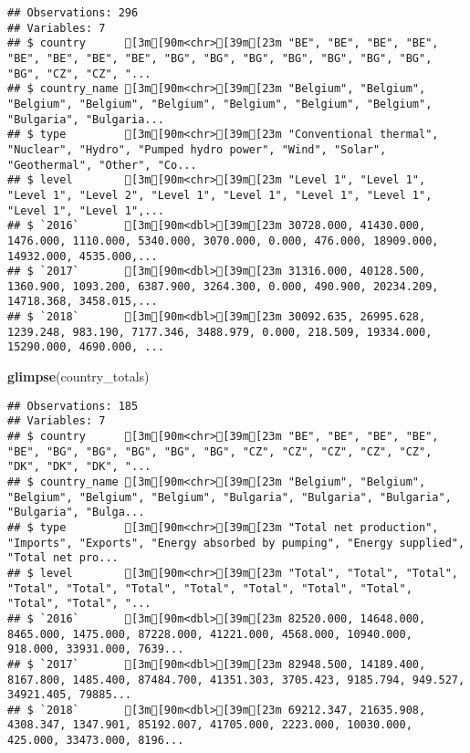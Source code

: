 \documentclass[
]{article}
\newenvironment{Shaded}{\begin{snugshade}}{\end{snugshade}}
\newcommand{\KeywordTok}[1]{\textcolor[rgb]{0.13,0.29,0.53}{\textbf{#1}}}
\newcommand{\NormalTok}[1]{#1}
\begin{document}
\begin{verbatim}
## Observations: 296
## Variables: 7
## $ country      [3m[90m<chr>[39m[23m "BE", "BE", "BE", "BE", "BE", "BE", "BE", "BE", "BG", "BG", "BG", "BG", "BG", "BG", "BG", "BG", "CZ", "CZ", "...
## $ country_name [3m[90m<chr>[39m[23m "Belgium", "Belgium", "Belgium", "Belgium", "Belgium", "Belgium", "Belgium", "Belgium", "Bulgaria", "Bulgaria...
## $ type         [3m[90m<chr>[39m[23m "Conventional thermal", "Nuclear", "Hydro", "Pumped hydro power", "Wind", "Solar", "Geothermal", "Other", "Co...
## $ level        [3m[90m<chr>[39m[23m "Level 1", "Level 1", "Level 1", "Level 2", "Level 1", "Level 1", "Level 1", "Level 1", "Level 1", "Level 1",...
## $ `2016`       [3m[90m<dbl>[39m[23m 30728.000, 41430.000, 1476.000, 1110.000, 5340.000, 3070.000, 0.000, 476.000, 18909.000, 14932.000, 4535.000,...
## $ `2017`       [3m[90m<dbl>[39m[23m 31316.000, 40128.500, 1360.900, 1093.200, 6387.900, 3264.300, 0.000, 490.900, 20234.209, 14718.368, 3458.015,...
## $ `2018`       [3m[90m<dbl>[39m[23m 30092.635, 26995.628, 1239.248, 983.190, 7177.346, 3488.979, 0.000, 218.509, 19334.000, 15290.000, 4690.000, ...
\end{verbatim}

\begin{Shaded}
\begin{Highlighting}[]
\KeywordTok{glimpse}\NormalTok{(country_totals)}
\end{Highlighting}
\end{Shaded}

\begin{verbatim}
## Observations: 185
## Variables: 7
## $ country      [3m[90m<chr>[39m[23m "BE", "BE", "BE", "BE", "BE", "BG", "BG", "BG", "BG", "BG", "CZ", "CZ", "CZ", "CZ", "CZ", "DK", "DK", "DK", "...
## $ country_name [3m[90m<chr>[39m[23m "Belgium", "Belgium", "Belgium", "Belgium", "Belgium", "Bulgaria", "Bulgaria", "Bulgaria", "Bulgaria", "Bulga...
## $ type         [3m[90m<chr>[39m[23m "Total net production", "Imports", "Exports", "Energy absorbed by pumping", "Energy supplied", "Total net pro...
## $ level        [3m[90m<chr>[39m[23m "Total", "Total", "Total", "Total", "Total", "Total", "Total", "Total", "Total", "Total", "Total", "Total", "...
## $ `2016`       [3m[90m<dbl>[39m[23m 82520.000, 14648.000, 8465.000, 1475.000, 87228.000, 41221.000, 4568.000, 10940.000, 918.000, 33931.000, 7639...
## $ `2017`       [3m[90m<dbl>[39m[23m 82948.500, 14189.400, 8167.800, 1485.400, 87484.700, 41351.303, 3705.423, 9185.794, 949.527, 34921.405, 79885...
## $ `2018`       [3m[90m<dbl>[39m[23m 69212.347, 21635.908, 4308.347, 1347.901, 85192.007, 41705.000, 2223.000, 10030.000, 425.000, 33473.000, 8196...
\end{verbatim}
\end{document}
